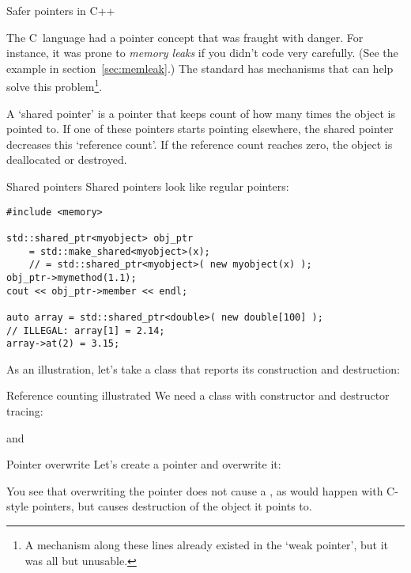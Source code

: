 
 {Safer pointers in C++}
\label{sec:shared_ptr}

The C~language had a pointer concept that was fraught with danger. For
instance, it was prone to
%
\emph{memory leaks}
if you didn't code very carefully. (See the example in 
section~\ref{sec:memleak}.)
%
The  standard has mechanisms that can
help solve this problem\footnote{A mechanism along these lines already
  existed in the `weak pointer', but it was all but unusable.}.

A `shared pointer' is a pointer that keeps count of how many times the
object is pointed to. If one of these pointers starts pointing
elsewhere, the shared pointer decreases this `reference count'. If the
reference count reaches zero, the object is deallocated or destroyed.

\begin{block}{Shared pointers}
  \label{sl:shared-ptr}
Shared pointers look like regular pointers:
\begin{verbatim}
#include <memory>

std::shared_ptr<myobject> obj_ptr
    = std::make_shared<myobject>(x);
    // = std::shared_ptr<myobject>( new myobject(x) );
obj_ptr->mymethod(1.1);
cout << obj_ptr->member << endl;

auto array = std::shared_ptr<double>( new double[100] );
// ILLEGAL: array[1] = 2.14;
array->at(2) = 3.15;
\end{verbatim}
\end{block}

As an illustration, let's take a class that reports its construction
and destruction:
%
\begin{block}{Reference counting illustrated}
  \label{sl:construct-destruct-trace}
  We need a class with constructor and destructor tracing:
\end{block}

%
and
\begin{block}{Pointer overwrite}
  \label{sl:shared-ptr-overwrite}
  Let's create a pointer and overwrite it:
\end{block}
%
You see that overwriting the pointer does not cause a
, as would happen with C-style pointers, but
causes destruction of the object it points to.

